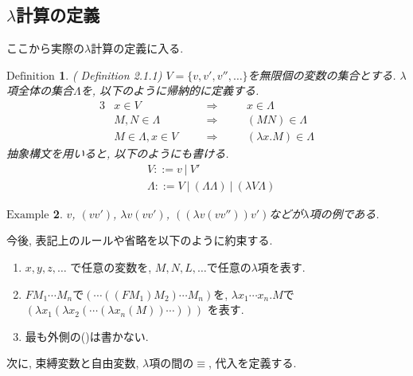 \documentclass[11pt]{jsreport}
\theoremstyle{mystyle}
\newtheorem{df}{$\textrm{Definition}$}[section]
\newtheorem{ex}[df]{$\textrm{Example}$}
\newcommand{\Lra}{\Longrightarrow}
\newcommand{\0}{\textbf{0}}
\begin{document}
\subsection*{$\lambda$計算の定義}
ここから実際の$\lambda$計算の定義に入る. 
\begin{shadebox}
  \begin{df}{(\cite{Bar} Definition 2.1.1)}
    $V = \{ v, v', v'', \ldots \}$を無限個の変数の集合とする. 
    $\lambda$項全体の集合$\Lambda$を, 以下のように帰納的に定義する. 
    \begin{alignat*}{3}
      &x \in V& \quad &\Lra& \quad &x \in \Lambda \\
      &M, N \in \Lambda& &\Lra& &(MN) \in \Lambda \\
      &M \in \Lambda, x \in V& &\Lra& &(\lambda x . M) \in \Lambda
    \end{alignat*}
    抽象構文を用いると, 以下のようにも書ける. 
    \begin{align*}
      &V ::= v\ |\ V' \\
      &\Lambda ::= V\ |\ (\Lambda \Lambda)\ |\ (\lambda V \Lambda)
    \end{align*}
  \end{df}
\end{shadebox}
\begin{ex}
  $v$, $(v v')$, $\lambda v (v v')$, $((\lambda v (vv''))v')$などが$\lambda$項の例である. 
\end{ex}
今後, 表記上のルールや省略を以下のように約束する. 
\begin{enumerate}
  \item $x, y, z, \ldots$ で任意の変数を, $M, N, L, \ldots$で任意の$\lambda$項を表す. 
  \item $F M_1 \cdots M_n$で$(\cdots ((F M_1) M_2)\cdots M_n)$を, 
           $\lambda x_1 \cdots x_n .M$で
           $(\lambda x_1 (\lambda x_2 (\cdots (\lambda x_n(M))\cdots)))$
            を表す. 
  \item 最も外側の()は書かない. 
\end{enumerate}
次に, 束縛変数と自由変数, $\lambda$項の間の$\equiv$, 代入を定義する. 
\end{document}
